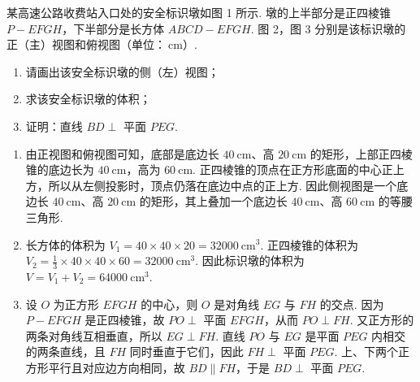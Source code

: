 \begin{problem}
某高速公路收费站入口处的安全标识墩如图 1 所示. 墩的上半部分是正四棱锥 \(P-EFGH\)，下半部分是长方体 \(ABCD-EFGH\). 图 2，图 3 分别是该标识墩的正（主）视图和俯视图（单位：\(\mathrm{~cm}\)）.

\begin{enumerate}
\item 请画出该安全标识墩的侧（左）视图；
\item 求该安全标识墩的体积；
\item 证明：直线 \(BD \perp\) 平面 \(PEG\).
\end{enumerate}

\end{problem}

\begin{solution}
\begin{enumerate}
\item 由正视图和俯视图可知，底部是底边长 \(40\mathrm{~cm}\)、高 \(20\mathrm{~cm}\) 的矩形，上部正四棱锥的底边长为 \(40\mathrm{~cm}\)，高为 \(60\mathrm{~cm}\). 正四棱锥的顶点在正方形底面的中心正上方，所以从左侧投影时，顶点仍落在底边中点的正上方. 因此侧视图是一个底边长 \(40\mathrm{~cm}\)、高 \(20\mathrm{~cm}\) 的矩形，其上叠加一个底边长 \(40\mathrm{~cm}\)、高 \(60\mathrm{~cm}\) 的等腰三角形.
\item 长方体的体积为
\(V_1=40\times40\times20=32000\mathrm{~cm}^3\). 正四棱锥的体积为
\(V_2=\frac13\times40\times40\times60=32000\mathrm{~cm}^3\). 因此标识墩的体积为
\(V=V_1+V_2=64000\mathrm{~cm}^3\).
\item 设 \(O\) 为正方形 \(EFGH\) 的中心，则 \(O\) 是对角线 \(EG\) 与 \(FH\) 的交点. 因为 \(P-EFGH\) 是正四棱锥，故 \(PO\perp\) 平面 \(EFGH\)，从而 \(PO\perp FH\). 又正方形的两条对角线互相垂直，所以 \(EG\perp FH\). 直线 \(PO\) 与 \(EG\) 是平面 \(PEG\) 内相交的两条直线，且 \(FH\) 同时垂直于它们，因此 \(FH\perp\) 平面 \(PEG\). 上、下两个正方形平行且对应边方向相同，故 \(BD\parallel FH\)，于是 \(BD\perp\) 平面 \(PEG\).
\end{enumerate}
\end{solution}

